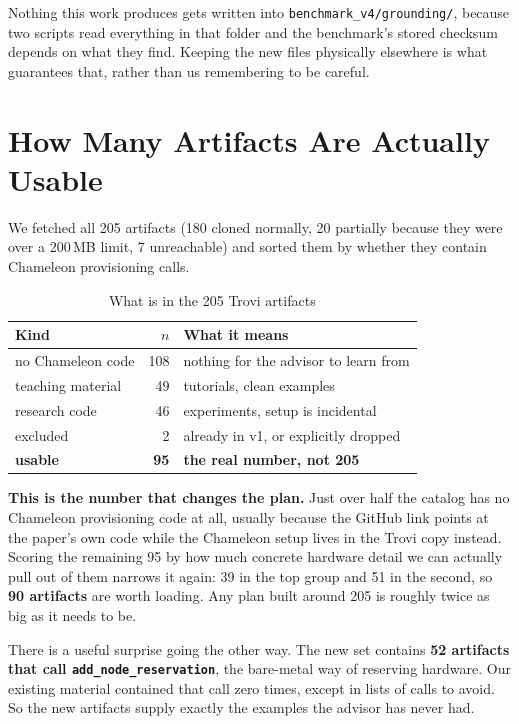 \documentclass[conference]{IEEEtran}
\begin{document}
Nothing this work produces gets written into
\texttt{benchmark\_v4/grounding/}, because two scripts read everything in that
folder and the benchmark's stored checksum depends on what they find. Keeping
the new files physically elsewhere is what guarantees that, rather than us
remembering to be careful.

\section{How Many Artifacts Are Actually Usable}

We fetched all 205 artifacts (180 cloned normally, 20 partially because they
were over a 200\,MB limit, 7 unreachable) and sorted them by whether they
contain Chameleon provisioning calls.

\begin{table}[h]
\caption{What is in the 205 Trovi artifacts}
\label{tab:sort}
\centering\footnotesize
\begin{tabular}{@{}lrl@{}}
\toprule
Kind & $n$ & What it means \\
\midrule
no Chameleon code & 108 & nothing for the advisor to learn from \\
teaching material & 49  & tutorials, clean examples \\
research code     & 46  & experiments, setup is incidental \\
excluded          & 2   & already in v1, or explicitly dropped \\
\midrule
\textbf{usable}   & \textbf{95} & \textbf{the real number, not 205} \\
\bottomrule
\end{tabular}
\end{table}

\textbf{This is the number that changes the plan.} Just over half the catalog
has no Chameleon provisioning code at all, usually because the GitHub link
points at the paper's own code while the Chameleon setup lives in the Trovi
copy instead. Scoring the remaining 95 by how much concrete hardware detail we
can actually pull out of them narrows it again: 39 in the top group and 51 in
the second, so \textbf{90 artifacts} are worth loading. Any plan built around
205 is roughly twice as big as it needs to be.

There is a useful surprise going the other way. The new set contains
\textbf{52 artifacts that call \texttt{add\_node\_reservation}}, the bare-metal
way of reserving hardware. Our existing material contained that call zero
times, except in lists of calls to avoid. So the new artifacts supply exactly
the examples the advisor has never had.
\end{document}
